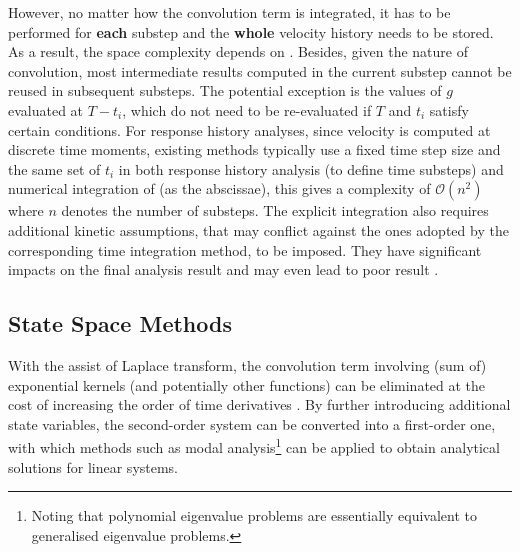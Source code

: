 However, no matter how the convolution term is integrated, it has to be performed for \textbf{each} substep and the \textbf{whole} velocity history needs to be stored. As a result, the space complexity depends on . Besides, given the nature of convolution, most intermediate results computed in the current substep cannot be reused in subsequent substeps. The potential exception is the values of $g$ evaluated at $T-t_i$, which do not need to be re-evaluated if $T$ and $t_i$ satisfy certain conditions. For response history analyses, since velocity is computed at discrete time moments, existing methods typically use a fixed time step size and the same set of $t_i$ in both response history analysis (to define time substeps) and numerical integration of  (as the abscissae), this gives a complexity of $\mathcal{O}\left(n^2\right)$ where $n$ denotes the number of substeps. The explicit integration also requires additional kinetic assumptions, that may conflict against the ones adopted by the corresponding time integration method, to be imposed. They have significant impacts on the final analysis result \citep[see][]{Liu2014} and may even lead to poor result \cite[see][Figs. 12, 17, 25, 26]{Liu2023}.
\subsection{State Space Methods}
With the assist of Laplace transform, the convolution term involving (sum of) exponential kernels (and potentially other functions) can be eliminated at the cost of increasing the order of time derivatives \citep[see, e.g.,][]{Wu2019}. By further introducing additional state variables, the second-order system  can be converted into a first-order one, with which methods such as modal analysis\footnote{Noting that polynomial eigenvalue problems are essentially equivalent to generalised eigenvalue problems.} can be applied to obtain analytical solutions for linear systems.

